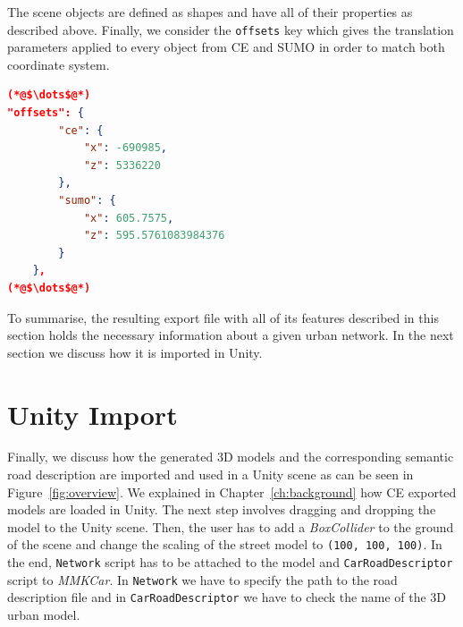 The scene objects are defined as shapes and have all of their properties as described above. Finally, we consider the \texttt{offsets} key which gives the translation parameters applied to every object from CE and SUMO in order to match both coordinate system. \\

    \begin{scriptsize}
        \begin{lstlisting}[language=json,firstnumber=1,caption={General overview of the offsets key in the JSON export format.},label={lis:format-node}]
(*@$\dots$@*)
"offsets": {
        "ce": {
            "x": -690985,
            "z": 5336220
        },
        "sumo": {
            "x": 605.7575,
            "z": 595.5761083984376
        }
    },
(*@$\dots$@*)
	   \end{lstlisting}
    \end{scriptsize}
    
To summarise, the resulting export file with all of its features described in this section holds the necessary information about a given urban network. In the next section we discuss how it is imported in Unity.

\section{Unity Import}

Finally, we discuss how the generated 3D models and the corresponding semantic road description are imported and used in a Unity scene as can be seen in Figure~\ref{fig:overview}. We explained in Chapter~\ref{ch:background} how CE exported models are loaded in Unity. The next step involves dragging and dropping the model to the Unity scene. Then, the user has to add a \emph{BoxCollider} to the ground of the scene and change the scaling of the street model to \texttt{(100, 100, 100)}. In the end, \texttt{Network} script has to be attached to the model and \texttt{CarRoadDescriptor} script to \emph{MMKCar}. In \texttt{Network} we have to specify the path to the road description file and in \texttt{CarRoadDescriptor} we have to check the name of the 3D urban model. 

